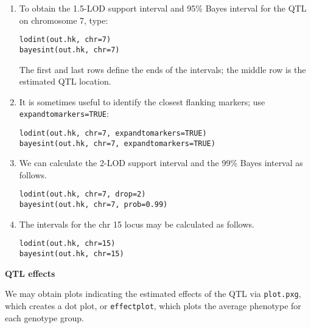 \documentclass[10pt,letterpaper]{article}
\newcommand{\usercolor}{\color [named]{BlueViolet}}
\begin{document}
\begin{enumerate}
\addtocounter{enumi}{28}
\item To obtain the 1.5-LOD support interval and 95\% Bayes interval
  for the QTL on chromosome 7, type:

\usercolor
\verb|lodint(out.hk, chr=7)| \\
\verb|bayesint(out.hk, chr=7)| 
\normalcolor

The first and last rows define the ends of the intervals; the middle
row is the estimated QTL location.

\item It is sometimes useful to identify the closest flanking markers;
  use \verb-expandtomarkers=TRUE-:

\usercolor
\verb|lodint(out.hk, chr=7, expandtomarkers=TRUE)| \\
\verb|bayesint(out.hk, chr=7, expandtomarkers=TRUE)| 
\normalcolor

\item We can calculate the 2-LOD support interval and the 99\% Bayes
  interval as follows.

\usercolor
\verb|lodint(out.hk, chr=7, drop=2)| \\
\verb|bayesint(out.hk, chr=7, prob=0.99)| 
\normalcolor

\item The intervals for the chr 15 locus may be calculated as follows.

\usercolor
\verb|lodint(out.hk, chr=15)| \\
\verb|bayesint(out.hk, chr=15)| 
\normalcolor

\end{enumerate}

\vspace{12pt}
\textbf{QTL effects} \vspace{6pt}
\nopagebreak

We may obtain plots indicating the estimated effects of the QTL via
\verb-plot.pxg-, which creates a dot plot, or \verb-effectplot-, which
plots the average phenotype for each genotype group.
\end{document}

